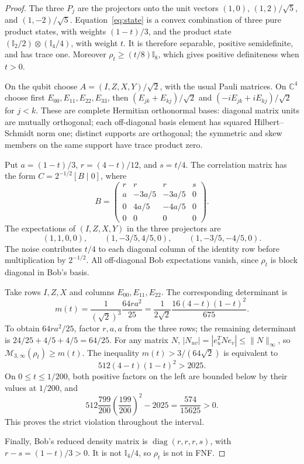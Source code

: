 \documentclass[11pt]{article}
\newcommand{\CM}{\mathcal M}
\newcommand{\Id}{\mathbb I}
\begin{document}
\begin{proof}
The three $P_j$ are the projectors onto the unit vectors
$(1,0)$, $(1,2)/\sqrt5$, and $(1,-2)/\sqrt5$.
Equation~\eqref{eq:state} is a convex combination of three pure product
states, with weights $(1-t)/3$, and the product state
$(\Id_2/2)\otimes(\Id_4/4)$, with weight $t$.
It is therefore separable, positive semidefinite, and has trace one.
Moreover $\rho_t\ge(t/8)\Id_8$, which gives positive definiteness when $t>0$.

On the qubit choose $A=(I,Z,X,Y)/\sqrt2$, with the usual Pauli matrices.
On $\mathbb C^4$ choose first $E_{00},E_{11},E_{22},E_{33}$,
then $(E_{jk}+E_{kj})/\sqrt2$ and
$(-iE_{jk}+iE_{kj})/\sqrt2$ for $j<k$.
These are complete Hermitian orthonormal bases: diagonal matrix units
are mutually orthogonal; each off-diagonal basis element has squared Hilbert--Schmidt norm
one; distinct supports are orthogonal; the symmetric and skew members
on the same support have trace product zero.

Put $a=(1-t)/3$, $r=(4-t)/12$, and $s=t/4$.
The correlation matrix has the form $C=2^{-1/2}[B\mid0]$, where
\begin{equation}\label{eq:matrix}
 B=\begin{pmatrix}
 r&r&r&s\\
 a&-3a/5&-3a/5&0\\
 0&4a/5&-4a/5&0\\
 0&0&0&0
 \end{pmatrix}.
\end{equation}
The expectations of $(I,Z,X,Y)$ in the three projectors are
\[
 (1,1,0,0),\qquad (1,-3/5,4/5,0),\qquad (1,-3/5,-4/5,0).
\]
The noise contributes $t/4$ to each diagonal
column of the identity row before multiplication by $2^{-1/2}$.
All off-diagonal Bob expectations vanish, since $\rho_t$ is block
diagonal in Bob's basis.

Take rows $I,Z,X$ and columns $E_{00},E_{11},E_{22}$.
The corresponding determinant is
\begin{equation}\label{eq:minor}
 m(t)=\frac1{(\sqrt2)^3}\frac{64ra^2}{25}
     =\frac1{2\sqrt2}\frac{16(4-t)(1-t)^2}{675}.
\end{equation}
To obtain $64ra^2/25$, factor $r,a,a$ from the three rows;
the remaining determinant is
$24/25+4/5+4/5=64/25$.
For any matrix $N$, $|N_{uv}|=|e_u^TN e_v|\le\|N\|_\infty$,
so $\CM_{3,\infty}(\rho_t)\ge m(t)$.
The inequality $m(t)>3/(64\sqrt2)$ is equivalent to
\begin{equation}\label{eq:scalar}
 512(4-t)(1-t)^2>2025.
\end{equation}
On $0\le t\le1/200$, both positive factors on the left are bounded
below by their values at $1/200$, and
\[
 512\frac{799}{200}\left(\frac{199}{200}\right)^2-2025
 =\frac{574}{15625}>0.
\]
This proves the strict violation throughout the interval.

Finally, Bob's reduced density matrix is
$\operatorname{diag}(r,r,r,s)$, with $r-s=(1-t)/3>0$.
It is not $\Id_4/4$, so $\rho_t$ is not in FNF.
\end{proof}
\end{document}
